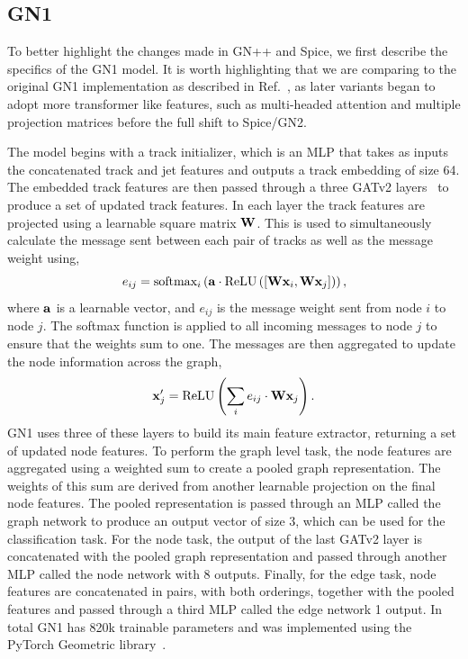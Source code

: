 \subsection{GN1}

To better highlight the changes made in GN++ and Spice, we first describe the specifics of the GN1 model.
It is worth highlighting that we are comparing to the original GN1 implementation as described in Ref.~\cite{GN1}, as later variants began to adopt more transformer like features, such as multi-headed attention and multiple projection matrices before the full shift to Spice/GN2.

The model begins with a track initializer, which is an MLP that takes as inputs the concatenated track and jet features and outputs a track embedding of size 64.
The embedded track features are then passed through a three GATv2 layers~\cite{GATv2} to produce a set of updated track features.
In each layer the track features are projected using a learnable square matrix $\mathbf{W}$.
This is used to simultaneously calculate the message sent between each pair of tracks as well as the message weight using,
\begin{equation}
    e_{ij} = \text{softmax}_i\left(\mathbf{a} \cdot \text{ReLU}\left([\mathbf{W} \mathbf{x}_i, \mathbf{W} \mathbf{x}_j]\right)\right),
\end{equation}
where $\mathbf{a}$ is a learnable vector, and $e_{ij}$ is the message weight sent from node $i$ to node $j$.
The softmax function is applied to all incoming messages to node $j$ to ensure that the weights sum to one.
The messages are then aggregated to update the node information across the graph,
\begin{equation}
    \mathbf{x}_j' = \text{ReLU}\left(\sum_{i} e_{ij} \cdot \mathbf{W} \mathbf{x}_j\right).
\end{equation}
GN1 uses three of these layers to build its main feature extractor, returning a set of updated node features.
To perform the graph level task, the node features are aggregated using a weighted sum to create a pooled graph representation.
The weights of this sum are derived from another learnable projection on the final node features.
The pooled representation is passed through an MLP called the graph network to produce an output vector of size 3, which can be used for the classification task.
For the node task, the output of the last GATv2 layer is concatenated with the pooled graph representation and passed through another MLP called the node network with 8 outputs.
Finally, for the edge task, node features are concatenated in pairs, with both orderings, together with the pooled features and passed through a third MLP called the edge network 1 output.
In total GN1 has 820k trainable parameters and was implemented using the PyTorch Geometric library~\cite{PyTorchGeometric}.


